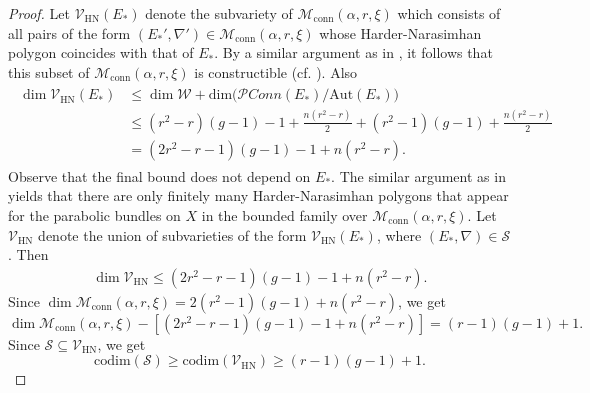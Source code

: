 \documentclass[11pt, reqno]{amsart}
\numberwithin{equation}{section}
\theoremstyle{definition}
\begin{document}
\begin{proof}
           Let $\mathcal{V}_\mathrm{HN}(E_*)$ denote the subvariety of $\mathcal{M}_{\mathrm{conn}}(\alpha, r, \xi)$ which consists of all pairs of the form $(E_*',\nabla') \in \mathcal{M}_{\mathrm{conn}}(\alpha, r, \xi)$ whose Harder-Narasimhan polygon coincides with that of $E_*$. By a similar argument as in \cite[Proposition $1.9$]{N86}, it follows that this subset of $\mathcal{M}_{\mathrm{conn}}(\alpha, r, \xi)$ is constructible (cf. \cite[Proposition $10$, p. $182$]{S77}). Also
           \begin{align}\label{maximum}
          \begin{split}
             \dim \mathcal{V}_\mathrm{HN}(E_*) & \leq \dim \mathcal{W}+ \mathrm{dim} \big(\mathcal{P}\textit{Conn}(E_*)/\mathrm{Aut}(E_*)\big) \\
             &\leq (r^2-r)(g-1)-1+\frac{n(r^2-r)}{2} + (r^2-1)(g-1) + \frac{n(r^2-r)}{2}\\
             &= (2r^2-r-1)(g-1) -1 +n(r^2-r).
          \end{split}
          \end{align}
          Observe that the final bound does not depend on $E_*$. The similar argument as in \cite[Proposition $11$, p. $183$]{S77} yields that there are only finitely many Harder-Narasimhan polygons that appear for the parabolic bundles on $X$
in the bounded family over $\mathcal{M}_{\mathrm{conn}}(\alpha, r, \xi)$. Let $\mathcal{V}_\mathrm{HN}$ denote the union of subvarieties of the form $\mathcal{V}_\mathrm{HN}(E_*)$, where $(E_*,\nabla) \in \mathcal{S}$. Then 
\begin{align*}
    \dim \mathcal{V}_\mathrm{HN} \leq (2r^2-r-1)(g-1) -1 +n(r^2-r).
\end{align*}
Since $\dim \mathcal{M}_{\mathrm{conn}}(\alpha, r, \xi) = 2(r^2-1)(g-1) + n(r^2-r)$, we get 
          \begin{equation*}
              \dim \mathcal{M}_{\mathrm{conn}}(\alpha, r, \xi) - [(2r^2-r-1)(g-1) -1 +n(r^2-r)] = (r-1)(g-1) + 1.
          \end{equation*}
          Since $\mathcal{S} \subseteq \mathcal{V}_\mathrm{HN}$, we get
          \[
          \mathrm{codim}(\mathcal{S}) \geq \mathrm{codim}(\mathcal{V}_\mathrm{HN}) \geq (r-1)(g-1)+1.
          \]  
       \end{proof}
	
	
	
\end{document}
